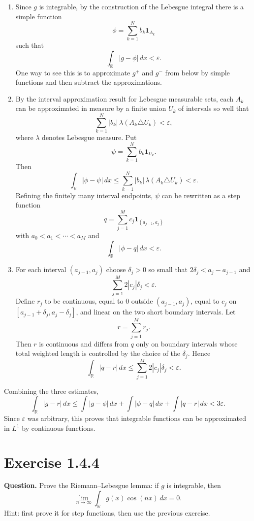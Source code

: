 \documentclass[11pt]{article}
\newcommand{\R}{\mathbb{R}}
\begin{document}
\begin{enumerate}[label=(\roman*)]
\item Since $g$ is integrable, by the construction of the Lebesgue
integral there is a simple function
\[
  \phi=\sum_{k=1}^N b_k\mathbf{1}_{A_k}
\]
such that
\[
  \int_{\R}|g-\phi|\,dx<\varepsilon.
\]
One way to see this is to approximate $g^+$ and $g^-$ from below by
simple functions and then subtract the approximations.

\item By the interval approximation result for Lebesgue measurable sets,
each $A_k$ can be approximated in measure by a finite union $U_k$ of
intervals so well that
\[
  \sum_{k=1}^N |b_k|\,\lambda(A_k\triangle U_k)<\varepsilon,
\]
where $\lambda$ denotes Lebesgue measure.  Put
\[
  \psi=\sum_{k=1}^N b_k\mathbf{1}_{U_k}.
\]
Then
\[
  \int_{\R}|\phi-\psi|\,dx
  \le
  \sum_{k=1}^N |b_k|\,\lambda(A_k\triangle U_k)
  <\varepsilon.
\]
Refining the finitely many interval endpoints, $\psi$ can be rewritten
as a step function
\[
  q=\sum_{j=1}^M c_j\mathbf{1}_{(a_{j-1},a_j)}
\]
with $a_0<a_1<\cdots<a_M$ and
\[
  \int_{\R}|\phi-q|\,dx<\varepsilon.
\]

\item For each interval $(a_{j-1},a_j)$ choose $\delta_j>0$ so small that
$2\delta_j<a_j-a_{j-1}$ and
\[
  \sum_{j=1}^M 2|c_j|\delta_j<\varepsilon.
\]
Define $r_j$ to be continuous, equal to $0$ outside
$(a_{j-1},a_j)$, equal to $c_j$ on
$[a_{j-1}+\delta_j,a_j-\delta_j]$, and linear on the two short boundary
intervals.  Let
\[
  r=\sum_{j=1}^M r_j.
\]
Then $r$ is continuous and differs from $q$ only on boundary intervals
whose total weighted length is controlled by the choice of the
$\delta_j$.  Hence
\[
  \int_{\R}|q-r|\,dx
  \le
  \sum_{j=1}^M 2|c_j|\delta_j
  <\varepsilon.
\]
\end{enumerate}

Combining the three estimates,
\[
  \int_{\R}|g-r|\,dx
  \le
  \int|g-\phi|\,dx+\int|\phi-q|\,dx+\int|q-r|\,dx
  <3\varepsilon.
\]
Since $\varepsilon$ was arbitrary, this proves that integrable functions
can be approximated in $L^1$ by continuous functions.

\section*{Exercise 1.4.4}

\noindent\textbf{Question.}
Prove the Riemann--Lebesgue lemma: if $g$ is integrable, then
\[
  \lim_{n\to\infty}\int_{\R} g(x)\cos(nx)\,dx=0.
\]
Hint: first prove it for step functions, then use the previous exercise.
\end{document}

